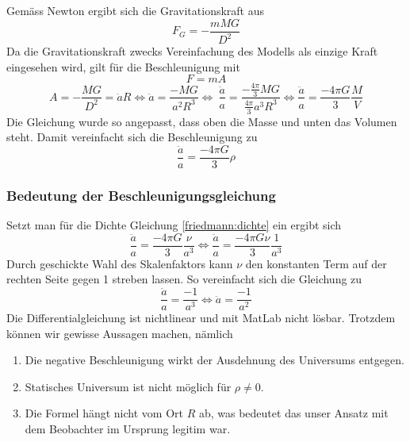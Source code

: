 \begin{refsection}
Gemäss Newton ergibt sich die Gravitationskraft aus
\begin{equation}
F_G = -\frac{m M G}{D^2}
\end{equation}
Da die Gravitationskraft zwecks Vereinfachung des Modells als einzige Kraft eingesehen wird, gilt für die Beschleunigung mit 
\[F = m A\]
\[A = - \frac{M G}{D^2} = \ddot{a} R \Leftrightarrow \ddot{a} = \frac{- M G}{a^2 R^3} \Leftrightarrow\ \frac{\ddot{a}}{a} = \frac{-\frac{4 \pi }{3} M G}{\frac{4 \pi}{3}a^3 R^3} \Leftrightarrow \frac{\ddot{a}}{a} = \frac{- 4 \pi G}{3} \frac{M}{V}\]
Die Gleichung wurde so angepasst, dass oben die Masse und unten das Volumen steht. Damit vereinfacht sich die Beschleunigung zu
\begin{equation}
\frac{\ddot{a}}{a} = \frac{- 4 \pi G}{3} \rho
\end{equation}
\subsubsection{Bedeutung der Beschleunigungsgleichung}
Setzt man für die Dichte Gleichung \ref{friedmann:dichte} ein ergibt sich
\[\frac{\ddot{a}}{a} = \frac{- 4 \pi G}{3} \frac{\nu}{a^3} \Leftrightarrow \frac{\ddot{a}}{a} = \frac{- 4 \pi G \nu}{3} \frac{1}{a^3}\]
Durch geschickte Wahl des Skalenfaktors kann $\nu$ den konstanten Term auf der rechten Seite gegen 1 streben lassen. So vereinfacht sich die Gleichung zu
\[\frac{\ddot{a}}{a} = \frac{-1}{a^3} \Leftrightarrow \ddot{a} = \frac{-1}{a^2}\]
Die Differentialgleichung ist nichtlinear und mit MatLab nicht lösbar. Trotzdem können wir gewisse Aussagen machen, nämlich
\begin{enumerate}
	\item Die negative Beschleunigung wirkt der Ausdehnung des Universums entgegen. 
	\item Statisches Universum ist nicht möglich für $\rho \neq 0$.
	\item Die Formel hängt nicht vom Ort $R$ ab, was bedeutet das unser Ansatz mit dem Beobachter im Ursprung legitim war.
\end{enumerate}


\end{refsection}
